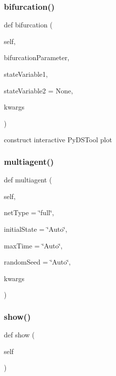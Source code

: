 \subsubsection{\texorpdfstring{bifurcation()}{bifurcation()}}
{\footnotesize\ttfamily def bifurcation (\begin{DoxyParamCaption}\item[{}]{self,  }\item[{}]{bifurcation\+Parameter,  }\item[{}]{state\+Variable1,  }\item[{}]{state\+Variable2 = {\ttfamily None},  }\item[{}]{kwargs }\end{DoxyParamCaption})}



construct interactive Py\+D\+S\+Tool plot 

\mbox{\label{class_mu_mo_t_1_1_mu_mo_tmodel_a55f7cab206306b09d38863395f186dbc}} 
\subsubsection{\texorpdfstring{multiagent()}{multiagent()}}
{\footnotesize\ttfamily def multiagent (\begin{DoxyParamCaption}\item[{}]{self,  }\item[{}]{net\+Type = {\ttfamily \char`\"{}full\char`\"{}},  }\item[{}]{initial\+State = {\ttfamily \char`\"{}Auto\char`\"{}},  }\item[{}]{max\+Time = {\ttfamily \char`\"{}Auto\char`\"{}},  }\item[{}]{random\+Seed = {\ttfamily \char`\"{}Auto\char`\"{}},  }\item[{}]{kwargs }\end{DoxyParamCaption})}

\mbox{\label{class_mu_mo_t_1_1_mu_mo_tmodel_ab4f4398c3f210fe4ea6e720401357691}} 
\subsubsection{\texorpdfstring{show()}{show()}}
{\footnotesize\ttfamily def show (\begin{DoxyParamCaption}\item[{}]{self }\end{DoxyParamCaption})}


